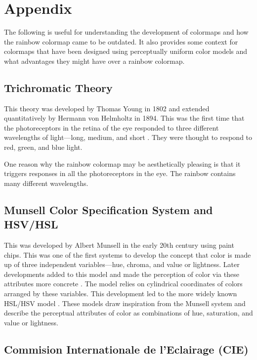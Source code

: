 \documentclass[journal,12pt]{IEEEtran}
\begin{document}
\section{Appendix}

The following is useful for understanding the development of 
colormaps and how the rainbow colormap came to be outdated. It also provides some context for colormaps that have been designed using perceptually uniform color models and what advantages they might have over a rainbow colormap.

\subsection{Trichromatic Theory}

This theory was developed by Thomas Young in 1802 and extended quantitatively by 
Hermann von Helmholtz in 1894. This was the first time that the photoreceptors
in the retina of the eye responded to three different wavelengths of light---long,
medium, and short \cite{colorimetry}. They were thought to respond to red, green, and blue light.

One reason why the rainbow colormap may be aesthetically pleasing is that it triggers responses in all the photoreceptors in the eye. The rainbow contains many different wavelengths.

\subsection{Munsell Color Specification System and HSV/HSL}

This was developed by Albert Munsell in the early 20th century using paint chips.
This was one of the first systems to develop the concept that color is
made up of three independent variables---hue, chroma, and value or lightness.
Later developments added to this model and made the perception of color via
these attributes more concrete \cite{colormapping}. The model relies on cylindrical coordinates
of colors arranged by these variables. This development led to the more
widely known HSL/HSV model \cite{colorimetry}. These models draw inspiration from the Munsell system
and describe the perceptual attributes of color as combinations of hue,
saturation, and value or lightness.

\subsection{Commision Internationale de l'Eclairage (CIE)}
\end{document}
